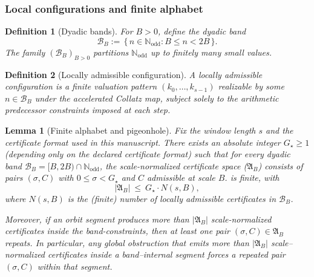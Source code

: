 \documentclass[preprint,12pt]{elsarticle}
\newtheorem{lemma}{Lemma}
\newtheorem{definition}{Definition}
\begin{document}
\subsubsection{Local configurations and finite alphabet}
\label{sec:local-configs}
\begin{definition}[Dyadic bands]
For \(B>0\), define the dyadic band
\[
\mathcal{B}_B := \,\{\, n\in\mathbb{N}_{\mathrm{odd}} : B \le n < 2B \,\}.
\]
The family \((\mathcal{B}_B)_{B>0}\) partitions \(\mathbb{N}_{\mathrm{odd}}\) up to finitely many small values.
\end{definition}

\begin{definition}[Locally admissible configuration]
A locally admissible configuration is a finite valuation pattern
\((k_0,\dots,k_{s-1})\) realizable by some \(n\in\mathcal{B}_B\) under the
accelerated Collatz map, subject solely to the arithmetic predecessor
constraints imposed at each step.
\end{definition}


\begin{lemma}[Finite alphabet and pigeonhole]
\label{lem:scale_norm_pigeonhole}
Fix the window length $s$ and the certificate format used in this manuscript.
There exists an absolute integer $G_\star\ge 1$ (depending only on the declared certificate format)
such that for every dyadic band $\mathcal{B}_B=[B,2B)\cap\mathbb{N}_{\mathrm{odd}}$,
the scale-normalized certificate space
(\(\mathfrak{A}_{B}\)) consists of pairs \((\sigma,C)\) with
\(0\le \sigma<G_\star\) and \(C\) admissible at scale \(B\).
is finite, with
\[
|\mathfrak{A}_{B}|\ \le\ G_\star\cdot N(s,B),
\]
where $N(s,B)$ is the (finite) number of locally admissible certificates in $\mathcal{B}_B$.

Moreover, if an orbit segment produces more than $|\mathfrak{A}_{B}|$ scale-normalized certificates inside the band-constraints,
then at least one pair $(\sigma,C)\in\mathfrak{A}_{B}$ repeats.
In particular, any global obstruction that emits more than $|\mathfrak{A}_{B}|$
scale--normalized certificates inside a band--internal segment forces a
repeated pair $(\sigma,C)$ within that segment.
\end{lemma}
\end{document}
